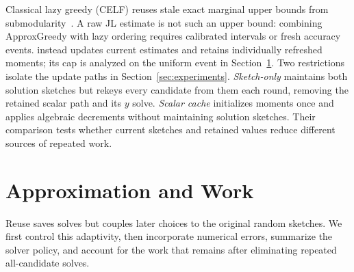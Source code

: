 Classical lazy greedy (CELF) reuses stale exact marginal upper bounds
from submodularity~\cite{leskovec2007}. A raw JL estimate is not such
an upper bound: combining ApproxGreedy with lazy ordering requires
calibrated intervals or fresh accuracy events. \alg{} instead updates
current estimates and retains individually refreshed moments; its
cap is analyzed on the uniform event in Section~\ref{sec:analysis}.
Two restrictions isolate the update paths in
Section~\ref{sec:experiments}. \emph{Sketch-only} maintains both
solution sketches but rekeys every candidate from them each round, removing the
retained scalar path and its $y$ solve. \emph{Scalar cache}
initializes moments once and applies algebraic decrements without
maintaining solution sketches. Their comparison tests whether current sketches
and retained values reduce different sources of repeated work.

\section{Approximation and Work}\label{sec:analysis}
Reuse saves solves but couples later choices to the original random
sketches. We first control this adaptivity, then incorporate numerical
errors, summarize the solver policy, and account for the work
that remains after eliminating repeated all-candidate solves.

